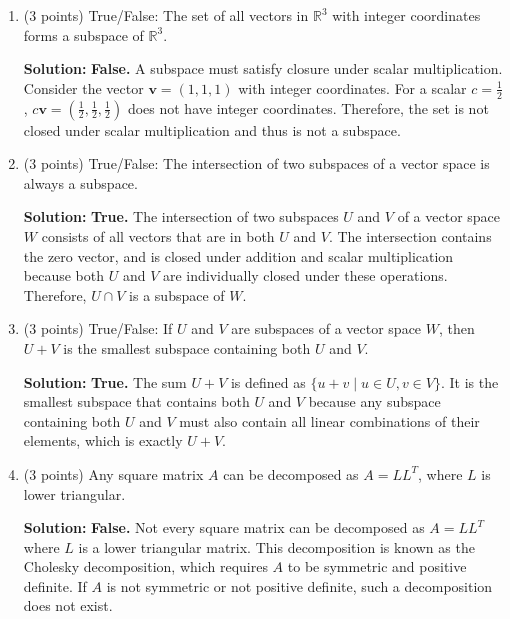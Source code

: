 \documentclass[12pt]{article}
\newcommand{\qspace}{\vspace{1em}} %
\newenvironment{solution}{\noindent\textbf{Solution:} }{\qspace}
\begin{document}
\begin{enumerate}
\begin{enumerate}
        \item (3 points) True/False: The set of all vectors in \( \mathbb{R}^3 \) with integer coordinates forms a subspace of \( \mathbb{R}^3 \).

        \begin{solution}
        \textbf{False.} A subspace must satisfy closure under scalar multiplication. Consider the vector \( \mathbf{v} = (1,1,1) \) with integer coordinates. For a scalar \( c = \frac{1}{2} \), \( c\mathbf{v} = (\frac{1}{2}, \frac{1}{2}, \frac{1}{2}) \) does not have integer coordinates. Therefore, the set is not closed under scalar multiplication and thus is not a subspace.
        \end{solution}
        
        \item (3 points) True/False: The intersection of two subspaces of a vector space is always a subspace.
        
        \begin{solution}
        \textbf{True.} The intersection of two subspaces \( U \) and \( V \) of a vector space \( W \) consists of all vectors that are in both \( U \) and \( V \). The intersection contains the zero vector, and is closed under addition and scalar multiplication because both \( U \) and \( V \) are individually closed under these operations. Therefore, \( U \cap V \) is a subspace of \( W \).
        \end{solution}
        
        \item (3 points) True/False: If \( U \) and \( V \) are subspaces of a vector space \( W \), then \( U + V \) is the smallest subspace containing both \( U \) and \( V \).
    
        \begin{solution}
        \textbf{True.} The sum \( U + V \) is defined as \( \{ u + v \mid u \in U, v \in V \} \). It is the smallest subspace that contains both \( U \) and \( V \) because any subspace containing both \( U \) and \( V \) must also contain all linear combinations of their elements, which is exactly \( U + V \).
        \end{solution}

        \item (3 points) Any square matrix \( A \) can be decomposed as \( A = LL^T \), where \( L \) is lower triangular.

        \begin{solution}
        \textbf{False.} Not every square matrix can be decomposed as \( A = LL^T \) where \( L \) is a lower triangular matrix. This decomposition is known as the Cholesky decomposition, which requires \( A \) to be symmetric and positive definite. If \( A \) is not symmetric or not positive definite, such a decomposition does not exist.
        \end{solution}
    

\end{enumerate}
\end{enumerate}
\end{document}
